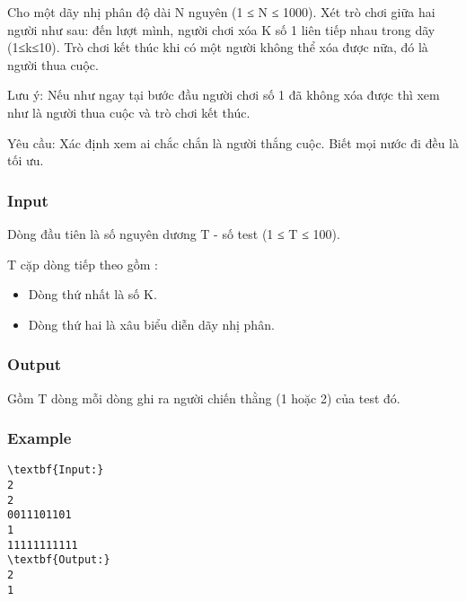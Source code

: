 

Cho một dãy nhị phân độ dài N nguyên (1 ≤ N ≤ 1000). Xét trò chơi giữa hai người như sau: đến lượt mình, người chơi xóa K số 1 liên tiếp nhau trong dãy (1≤k≤10). Trò chơi kết thúc khi có một người không thể xóa được nữa, đó là người thua cuộc.

Lưu ý: Nếu như ngay tại bước đầu người chơi số 1 đã không xóa được thì xem như là người thua cuộc và trò chơi kết thúc.

Yêu cầu: Xác định xem ai chắc chắn là người thắng cuộc. Biết mọi nước đi đều là tối ưu.

\subsubsection{Input}

Dòng đầu tiên là số nguyên dương T - số test (1 ≤ T ≤ 100).

T cặp dòng tiếp theo gồm :
\begin{itemize}
	\item Dòng thứ nhất là số K.
	\item Dòng thứ hai là xâu biểu diễn dãy nhị phân.
\end{itemize}

\subsubsection{Output}

Gồm T dòng mỗi dòng ghi ra người chiến thằng (1 hoặc 2) của test đó.

\subsubsection{Example}
\begin{verbatim}
\textbf{Input:}
2
2
0011101101
1
11111111111
\textbf{Output:}
2
1\end{verbatim}